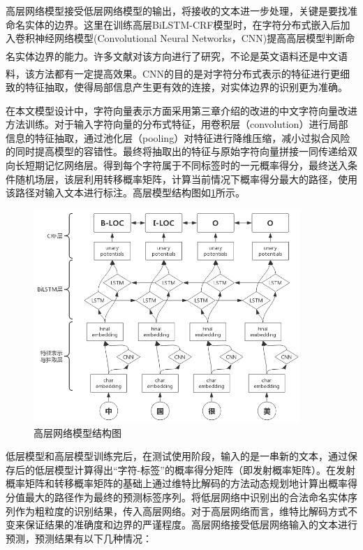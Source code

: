 \documentclass[winfonts,master,oneside,nobackinfo]{njuthesis}
\newcommand{\upcite}[1]{\textsuperscript{\textsuperscript{\cite{#1}}}}
\begin{document}
高层网络模型接受低层网络模型的输出，将接收的文本进一步处理，关键是要找准命名实体的边界。这里在训练高层BiLSTM-CRF模型时，在字符分布式嵌入后加入卷积神经网络模型(Convolutional Neural Networks，CNN)提高高层模型判断命名实体边界的能力。许多文献对该方向进行了研究\upcite{Ma,kang}，不论是英文语料\upcite{Zenan}还是中文语料\upcite{Yaozong}，该方法都有一定提高效果。CNN的目的是对字符分布式表示的特征进行更细致的特征抽取，使得局部信息产生更有效的连接，对实体边界的识别更为准确。

在本文模型设计中，字符向量表示方面采用第三章介绍的改进的中文字符向量改进方法训练。对于输入字符向量的分布式特征，用卷积层（convolution）进行局部信息的特征抽取，通过池化层（pooling）对特征进行降维压缩，减小过拟合风险的同时提高模型的容错性。最终将抽取出的特征与原始字符向量拼接一同传递给双向长短期记忆网络层。得到每个字符属于不同标签时的一元概率得分，最终送入条件随机场层，该层利用转移概率矩阵，计算当前情况下概率得分最大的路径，使用该路径对输入文本进行标注。高层模型结构图如\ref{high-level}所示。

\begin{figure}[h]
\centering
\includegraphics[width=0.9\textwidth]{./figure/CNN辅助.jpg}
\caption{高层网络模型结构图}
\label{high-level}
\end{figure}

低层模型和高层模型训练完后，在测试使用阶段，输入的是一串新的文本，通过保存后的低层模型计算得出“字符-标签”的概率得分矩阵（即发射概率矩阵）。在发射概率矩阵和转移概率矩阵的基础上通过维特比解码的方法动态规划地计算出概率得分值最大的路径作为最终的预测标签序列。将低层网络中识别出的合法命名实体序列作为粗粒度的识别结果，传入高层网络。对于高层网络而言，维特比解码方式不变来保证结果的准确度和边界的严谨程度。高层网络接受低层网络输入的文本进行预测，预测结果有以下几种情况：
\end{document}
